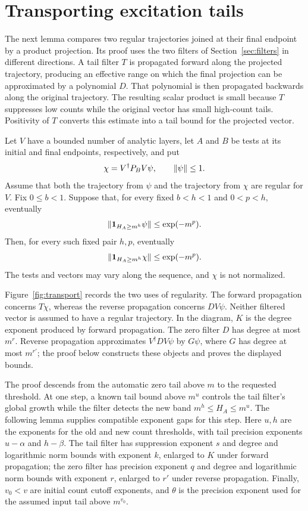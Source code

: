 \section{Transporting excitation tails}
\label{sec:transport}

The next lemma compares two regular trajectories joined at their final
endpoint by a product projection.  Its proof uses the two filters of
Section~\ref{sec:filters} in different directions.  A tail filter $T$
is propagated forward along the projected trajectory, producing an
effective range on which the final projection can be approximated by a
polynomial $D$.  That polynomial is then propagated backwards along the
original trajectory.  The resulting scalar product is small because
$T$ suppresses low counts while the original vector has small high-count
tails.  Positivity of $T$ converts this estimate into a tail bound for
the projected vector.

\begin{lemma}
\label{lem:tail-transport}
Let $V$ have a bounded number of analytic layers, let $A$ and $B$ be
tests at its initial and final endpoints, respectively, and put
\[
 \chi=V^\dagger P_BV\psi,
 \qquad \lVert\psi\rVert\le1.
\]
Assume that both the trajectory from $\psi$ and the trajectory from
$\chi$ are regular for $V$.  Fix $0\le b<1$.  Suppose that, for every
fixed $b<h<1$ and $0<p<h$, eventually
\begin{equation}
 \label{eq:input-tail}
 \lVert\mathbf 1_{H_A\ge m^h}\psi\rVert\le\exp(-m^p).
\end{equation}
Then, for every such fixed pair $h,p$, eventually
\[
 \lVert\mathbf 1_{H_A\ge m^h}\chi\rVert\le\exp(-m^p).
\]
The tests and vectors may vary along the sequence, and $\chi$ is not
normalized.
\end{lemma}

Figure~\ref{fig:transport} records the two uses of regularity.  The
forward propagation concerns $T\chi$, whereas the reverse propagation
concerns $DV\psi$.  Neither filtered vector is assumed to have a regular
trajectory.
In the diagram, $K$ is the degree exponent produced by forward propagation.
The zero filter $D$ has degree at most $m^r$.
Reverse propagation approximates $V^\dagger DV\psi$ by $G\psi$, where $G$
has degree at most $m^{r'}$; the proof below constructs these objects and
proves the displayed bounds.



The proof descends from the automatic zero tail above $m$ to the requested
threshold. At one step, a known tail bound above $m^u$ controls the tail
filter's global growth while the filter detects the new band
$m^h\le H_A\le m^u$. The following lemma supplies compatible exponent gaps
for this step.
Here $u,h$ are the exponents for the old and new count thresholds,
with tail precision exponents $u-\alpha$ and $h-\beta$.
The tail filter has suppression exponent $s$ and degree and logarithmic
norm bounds with exponent $k$, enlarged to $K$ under forward propagation;
the zero filter has precision exponent $q$ and degree and logarithmic
norm bounds with exponent $r$, enlarged to $r'$ under reverse propagation.
Finally, $v_0<v$ are initial count cutoff exponents, and $\theta$ is
the precision exponent used for the assumed input tail above $m^{v_0}$.

